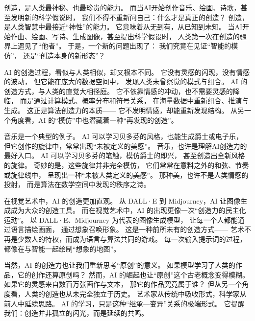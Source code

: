 创造，是人类最神秘、也最珍贵的能力。  
而当AI开始创作音乐、绘画、诗歌，甚至发明新的科学假说时，  
我们不得不重新问自己：什么才是真正的创造？  
创造，是人类智慧中最接近“神性”的能力。  
它意味着从无到有，从已知到未知。  
当AI开始作曲、绘画、写诗、生成图像，甚至提出科学假设时，  
人类第一次在创造的疆界上遇见了“他者”。  
于是，一个新的问题出现了：  
我们究竟在见证“智能的模仿”，  
还是“创造本身的新形态”？

AI 的创造过程，看似与人类相似，却又根本不同。  
它没有灵感的闪现，没有情感的波动，  
但它能在庞大的数据空间中，  
发现人类未曾察觉的模式与组合。  
AI 的创造方式，与人类的直觉大相径庭。  
它不依靠情感的冲动，也不需要灵感的降临，  
而是通过计算模式、概率分布和符号关系，  
在海量数据中重新组合、推演与生成。  
这正是算法创造力的本质——  
它不发明情感，却能重新发现结构。  
从另一个角度看，AI 的“模仿”中也潜藏着一种“再发现的创造”。

音乐是一个典型的例子。  
AI 可以学习贝多芬的风格，也能生成爵士或电子乐，  
但它创作的旋律中，常常出现“未被定义的美感”。  
音乐，也许是理解AI创造力的最好入口。  
AI 可以学习贝多芬的笔触，模仿爵士的即兴，  
甚至创造出全新风格的旋律。  
奇妙的是，这些旋律并非完全模仿，  
它们常常在意料之外的和弦、节奏或旋律线中，  
呈现出一种“未被人类定义的美感”。  
那种美，也许不是人类情感的投射，  
而是算法在数学空间中发现的秩序之诗。

在视觉艺术中，AI 的创造更加直观。  
从 DALL·E 到 Midjourney，AI 让图像生成成为大众的创造工具。  
而在视觉艺术中，AI 的出现更像一次“创造力的民主化运动”。  
以 DALL·E、Midjourney 为代表的图像生成模型，  
让每一个人都能通过语言描绘画面，  
通过想象召唤形象。  
这是一种前所未有的创造方式——  
艺术不再是少数人的特权，而成为语言与算法共同的游戏。  
每一次输入提示词的过程，  
都像在与智能一起绘制“想象的地图”。

当然，AI 的创造力也让我们重新思考“原创”的意义。  
如果模型学习了人类的作品，它的创作还算原创吗？  
然而，AI 的崛起也让“原创”这个古老概念变得模糊。  
如果它的灵感来自数百万张画作与文本，  
那它的作品究竟属于谁？  
但从另一个角度看，人类的创造也从未完全独立于历史。  
艺术家从传统中吸收形式，科学家从前人中延续思路。  
AI 的学习，只是这种“继承—变异”关系的极端形式。  
它提醒我们：创造并非孤立的闪光，而是延续的共鸣。


